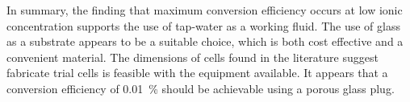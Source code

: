 

  In summary, the finding that maximum conversion efficiency occurs at low ionic concentration supports the use of tap-water as a working fluid.
  The use of glass as a substrate appears to be a suitable choice, which is both cost effective and a convenient material.
  The dimensions of cells found in the literature suggest fabricate trial cells is feasible with the equipment available.
  It appears that a conversion efficiency of \SI{0.01}{\percent} should be achievable using a porous glass plug.

